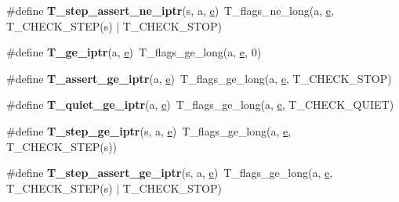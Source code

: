 \begin{DoxyCompactItemize}
\#define {\bfseries T\+\_\+step\+\_\+assert\+\_\+ne\+\_\+iptr}(s,  a,  \mbox{\hyperlink{sun4u_2tte_8h_a8b0b9ed08e0e18920ec2682f48228c27}{e}})~T\+\_\+flags\+\_\+ne\+\_\+long(a, \mbox{\hyperlink{sun4u_2tte_8h_a8b0b9ed08e0e18920ec2682f48228c27}{e}}, T\+\_\+\+C\+H\+E\+C\+K\+\_\+\+S\+T\+EP(s) $\vert$ T\+\_\+\+C\+H\+E\+C\+K\+\_\+\+S\+T\+OP)
\item 
\mbox{\label{group__RTEMSTestFrameworkChecksIntptr_gac295b1168f949eecd3e7eba2a6354e15}} 
\#define {\bfseries T\+\_\+ge\+\_\+iptr}(a,  \mbox{\hyperlink{sun4u_2tte_8h_a8b0b9ed08e0e18920ec2682f48228c27}{e}})~T\+\_\+flags\+\_\+ge\+\_\+long(a, \mbox{\hyperlink{sun4u_2tte_8h_a8b0b9ed08e0e18920ec2682f48228c27}{e}}, 0)
\item 
\mbox{\label{group__RTEMSTestFrameworkChecksIntptr_ga2931d9fcd41fd1985193c3430d60aa76}} 
\#define {\bfseries T\+\_\+assert\+\_\+ge\+\_\+iptr}(a,  \mbox{\hyperlink{sun4u_2tte_8h_a8b0b9ed08e0e18920ec2682f48228c27}{e}})~T\+\_\+flags\+\_\+ge\+\_\+long(a, \mbox{\hyperlink{sun4u_2tte_8h_a8b0b9ed08e0e18920ec2682f48228c27}{e}}, T\+\_\+\+C\+H\+E\+C\+K\+\_\+\+S\+T\+OP)
\item 
\mbox{\label{group__RTEMSTestFrameworkChecksIntptr_ga64a7d90b0780230d6f2f7a1339d907a3}} 
\#define {\bfseries T\+\_\+quiet\+\_\+ge\+\_\+iptr}(a,  \mbox{\hyperlink{sun4u_2tte_8h_a8b0b9ed08e0e18920ec2682f48228c27}{e}})~T\+\_\+flags\+\_\+ge\+\_\+long(a, \mbox{\hyperlink{sun4u_2tte_8h_a8b0b9ed08e0e18920ec2682f48228c27}{e}}, T\+\_\+\+C\+H\+E\+C\+K\+\_\+\+Q\+U\+I\+ET)
\item 
\mbox{\label{group__RTEMSTestFrameworkChecksIntptr_ga2ecb735370b18e306b8aa6d15f86a7c1}} 
\#define {\bfseries T\+\_\+step\+\_\+ge\+\_\+iptr}(s,  a,  \mbox{\hyperlink{sun4u_2tte_8h_a8b0b9ed08e0e18920ec2682f48228c27}{e}})~T\+\_\+flags\+\_\+ge\+\_\+long(a, \mbox{\hyperlink{sun4u_2tte_8h_a8b0b9ed08e0e18920ec2682f48228c27}{e}}, T\+\_\+\+C\+H\+E\+C\+K\+\_\+\+S\+T\+EP(s))
\item 
\mbox{\label{group__RTEMSTestFrameworkChecksIntptr_ga2ca3bd29888d311d2291fb71f7f0f4d7}} 
\#define {\bfseries T\+\_\+step\+\_\+assert\+\_\+ge\+\_\+iptr}(s,  a,  \mbox{\hyperlink{sun4u_2tte_8h_a8b0b9ed08e0e18920ec2682f48228c27}{e}})~T\+\_\+flags\+\_\+ge\+\_\+long(a, \mbox{\hyperlink{sun4u_2tte_8h_a8b0b9ed08e0e18920ec2682f48228c27}{e}}, T\+\_\+\+C\+H\+E\+C\+K\+\_\+\+S\+T\+EP(s) $\vert$ T\+\_\+\+C\+H\+E\+C\+K\+\_\+\+S\+T\+OP)

\end{DoxyCompactItemize}
